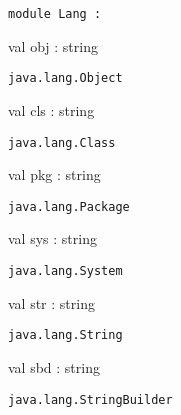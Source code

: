 \documentclass[11pt]{article}
\begin{document}
\begin{ocamldoccode}
{\tt{module }}{\tt{Lang}}{\tt{ : }}\end{ocamldoccode}
\label{module:Java.Lang}

\begin{ocamldocsigend}


\label{val:Java.Lang.obj}\begin{ocamldoccode}
val obj : string
\end{ocamldoccode}
\begin{ocamldocdescription}
{\tt{java.lang.Object}}


\end{ocamldocdescription}


\label{val:Java.Lang.cls}\begin{ocamldoccode}
val cls : string
\end{ocamldoccode}
\begin{ocamldocdescription}
{\tt{java.lang.Class}}


\end{ocamldocdescription}


\label{val:Java.Lang.pkg}\begin{ocamldoccode}
val pkg : string
\end{ocamldoccode}
\begin{ocamldocdescription}
{\tt{java.lang.Package}}


\end{ocamldocdescription}


\label{val:Java.Lang.sys}\begin{ocamldoccode}
val sys : string
\end{ocamldoccode}
\begin{ocamldocdescription}
{\tt{java.lang.System}}


\end{ocamldocdescription}


\label{val:Java.Lang.str}\begin{ocamldoccode}
val str : string
\end{ocamldoccode}
\begin{ocamldocdescription}
{\tt{java.lang.String}}


\end{ocamldocdescription}


\label{val:Java.Lang.sbd}\begin{ocamldoccode}
val sbd : string
\end{ocamldoccode}
\begin{ocamldocdescription}
{\tt{java.lang.StringBuilder}}



\end{ocamldocdescription}
\end{ocamldocsigend}
\end{document}
